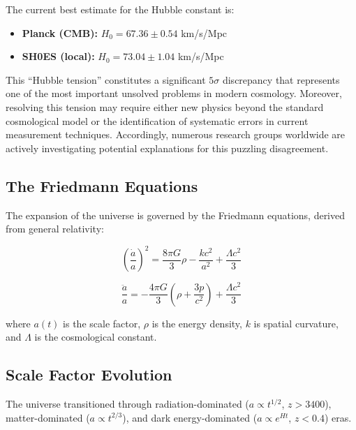 \documentclass[11pt,a4paper]{article}
\begin{document}
The current best estimate for the Hubble constant is:

\begin{itemize}[noitemsep]
    \item \textbf{Planck (CMB):} $H_0 = 67.36 \pm 0.54$ km/s/Mpc
    \item \textbf{SH0ES (local):} $H_0 = 73.04 \pm 1.04$ km/s/Mpc
\end{itemize}

This ``Hubble tension'' constitutes a significant $5\sigma$ discrepancy that represents one of the most important unsolved problems in modern cosmology. Moreover, resolving this tension may require either new physics beyond the standard cosmological model or the identification of systematic errors in current measurement techniques. Accordingly, numerous research groups worldwide are actively investigating potential explanations for this puzzling disagreement.

\subsection{The Friedmann Equations}

The expansion of the universe is governed by the Friedmann equations, derived from general relativity:

\begin{equationbox}
\begin{equation}
\left(\frac{\dot{a}}{a}\right)^2 = \frac{8\pi G}{3}\rho - \frac{kc^2}{a^2} + \frac{\Lambda c^2}{3}
\label{eq:friedmann1}
\end{equation}

\begin{equation}
\frac{\ddot{a}}{a} = -\frac{4\pi G}{3}\left(\rho + \frac{3p}{c^2}\right) + \frac{\Lambda c^2}{3}
\label{eq:friedmann2}
\end{equation}
\end{equationbox}

where $a(t)$ is the scale factor, $\rho$ is the energy density, $k$ is spatial curvature, and $\Lambda$ is the cosmological constant.

\subsection{Scale Factor Evolution}

The universe transitioned through radiation-dominated ($a \propto t^{1/2}$, $z > 3400$), matter-dominated ($a \propto t^{2/3}$), and dark energy-dominated ($a \propto e^{Ht}$, $z < 0.4$) eras.
\end{document}
